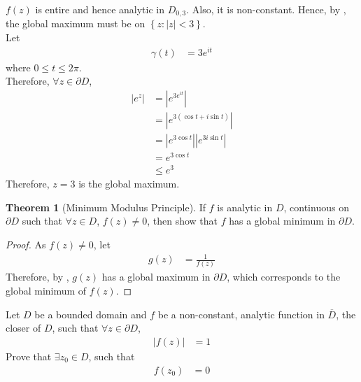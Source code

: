 \documentclass[titlepage, fleqn, a4paper, 12pt, twoside]{article}
\theoremstyle{definition}
\theoremstyle{theorem}
\newtheorem{theorem}{Theorem}
\begin{document}
\begin{solution}
	$f(z)$ is entire and hence analytic in $D_{0,3}$.
	Also, it is non-constant.
	Hence, by , the global maximum must be on $\left\{ z : |z| < 3 \right\}$.\\
	Let
	\begin{align*}
		\gamma(t) & = 3 e^{i t}
	\end{align*}
	where $0 \le t \le 2 \pi$.\\
	Therefore, $\forall z \in \partial D$,
	\begin{align*}
		\left| e^z \right| & = \left| e^{3 e^{i t}} \right|                              \\
                                   & = \left| e^{3 (\cos t + i \sin t)} \right|                  \\
                                   & = \left| e^{3 \cos t} \right| \left| e^{3 i \sin t} \right| \\
                                   & = e^{3 \cos t}                                              \\
                                   & \le e^3
	\end{align*}
	Therefore, $z = 3$ is the global maximum.
\end{solution}

\begin{theorem}[Minimum Modulus Principle]
	If $f$ is analytic in $D$, continuous on $\partial D$ such that $\forall z \in D$, $f(z) \neq 0$, then show that $f$ has a global minimum in $\partial D$.
	\label{thm:Minimum_Modulus_Principle}
\end{theorem}

\begin{proof}
	As $f(z) \neq 0$, let
	\begin{align*}
		g(z) & = \frac{1}{f(z)}
	\end{align*}
	Therefore, by , $g(z)$ has a global maximum in $\partial D$, which corresponds to the global minimum of $f(z)$.
\end{proof}

\begin{question}
	Let $D$ be a bounded domain and $f$ be a non-constant, analytic function in $\overline{D}$, the closer of $D$, such that $\forall z \in \partial D$,
	\begin{align*}
		\left| f(z) \right| & = 1
	\end{align*}
	Prove that $\exists z_0 \in D$, such that
	\begin{align*}
		f(z_0) & = 0
	\end{align*}
\end{question}
\end{document}
